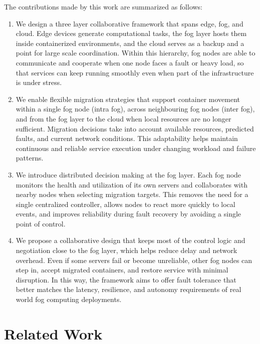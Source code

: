 \documentclass{article}
\begin{document}
The contributions made by this work are summarized as follows:
\begin{enumerate}
    \item We design a three layer collaborative framework that spans edge, fog, and cloud. Edge devices generate computational tasks, the fog layer hosts them inside containerized environments, and the cloud serves as a backup and a point for large scale coordination. Within this hierarchy, fog nodes are able to communicate and cooperate when one node faces a fault or heavy load, so that services can keep running smoothly even when part of the infrastructure is under stress.
    
    \item We enable flexible migration strategies that support container movement within a single fog node (intra fog), across neighbouring fog nodes (inter fog), and from the fog layer to the cloud when local resources are no longer sufficient. Migration decisions take into account available resources, predicted faults, and current network conditions. This adaptability helps maintain continuous and reliable service execution under changing workload and failure patterns.
    
    \item We introduce distributed decision making at the fog layer. Each fog node monitors the health and utilization of its own servers and collaborates with nearby nodes when selecting migration targets. This removes the need for a single centralized controller, allows nodes to react more quickly to local events, and improves reliability during fault recovery by avoiding a single point of control.
    
    \item We propose a collaborative design that keeps most of the control logic and negotiation close to the fog layer, which helps reduce delay and network overhead. Even if some servers fail or become unreliable, other fog nodes can step in, accept migrated containers, and restore service with minimal disruption. In this way, the framework aims to offer fault tolerance that better matches the latency, resilience, and autonomy requirements of real world fog computing deployments.
\end{enumerate}



\section{Related Work} \label{sec:related}
\end{document}
